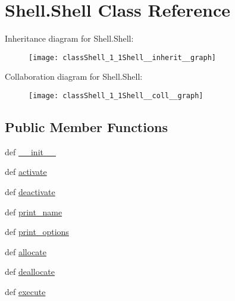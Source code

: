 \hypertarget{classShell_1_1Shell}{\section{Shell.\-Shell Class Reference}
\label{classShell_1_1Shell}
}


Inheritance diagram for Shell.\-Shell\-:\nopagebreak
\begin{figure}[H]
\begin{center}
\leavevmode
\texttt{[image: classShell\_1\_1Shell\_\_inherit\_\_graph]}
\end{center}
\end{figure}


Collaboration diagram for Shell.\-Shell\-:\nopagebreak
\begin{figure}[H]
\begin{center}
\leavevmode
\texttt{[image: classShell\_1\_1Shell\_\_coll\_\_graph]}
\end{center}
\end{figure}
\subsection*{Public Member Functions}
\begin{DoxyCompactItemize}
\item 
def \hyperlink{classShell_1_1Shell_a36cee8fc1bc0b3444cc672f5b66c0708}{\-\_\-\-\_\-init\-\_\-\-\_\-}
\item 
def \hyperlink{classShell_1_1Shell_a043911923f93dbf079dd559bb11843d0}{activate}
\item 
def \hyperlink{classShell_1_1Shell_af706278120f05ee7bdc82cc1a19becb2}{deactivate}
\item 
def \hyperlink{classShell_1_1Shell_a95d4da6fd233685f5ecbe7837dbc35ac}{print\-\_\-name}
\item 
def \hyperlink{classShell_1_1Shell_a7530d09d0ec49e48665d34c4dd5d7dfa}{print\-\_\-options}
\item 
def \hyperlink{classShell_1_1Shell_aaea88fad0ba8f7bf1da2fc113021add9}{allocate}
\item 
def \hyperlink{classShell_1_1Shell_ad0d25de668c93990107294a472b80737}{deallocate}
\item 
def \hyperlink{classShell_1_1Shell_a64c0f9c5cfbea625d0a3323a8b7c0f39}{execute}
\end{DoxyCompactItemize}
